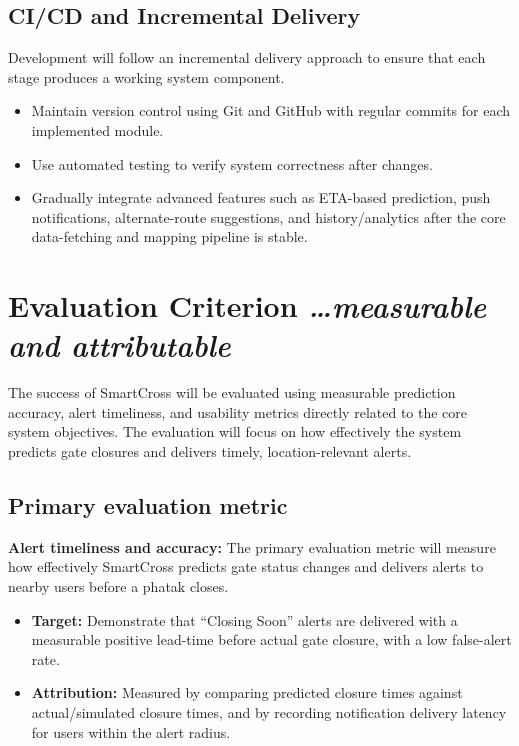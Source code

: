 \documentclass[11pt,a4paper]{article}
\newcommand{\BvrHint}[1]{%
  {\normalfont\normalsize\itshape\hfill #1}}
\begin{document}
\subsection{CI/CD and Incremental Delivery}

Development will follow an incremental delivery approach to ensure that each stage produces a working system component.

\begin{itemize}
    \item Maintain version control using Git and GitHub with regular commits for each implemented module.

    \item Use automated testing to verify system correctness after changes.

    \item Gradually integrate advanced features such as ETA-based prediction, push notifications, alternate-route suggestions, and history/analytics after the core data-fetching and mapping pipeline is stable.
\end{itemize}

\section{Evaluation Criterion %
\BvrHint{\ldots measurable and attributable}}

The success of SmartCross will be evaluated using measurable prediction accuracy, alert timeliness, and usability metrics directly related to the core system objectives. The evaluation will focus on how effectively the system predicts gate closures and delivers timely, location-relevant alerts.


\subsection{Primary evaluation metric}

\textbf{Alert timeliness and accuracy:} The primary evaluation metric will measure how effectively SmartCross predicts gate status changes and delivers alerts to nearby users before a phatak closes.

\begin{itemize}
    \item \textbf{Target:} Demonstrate that ``Closing Soon'' alerts are delivered with a measurable positive lead-time before actual gate closure, with a low false-alert rate.

    \item \textbf{Attribution:} Measured by comparing predicted closure times against actual/simulated closure times, and by recording notification delivery latency for users within the alert radius.
\end{itemize}
\end{document}
